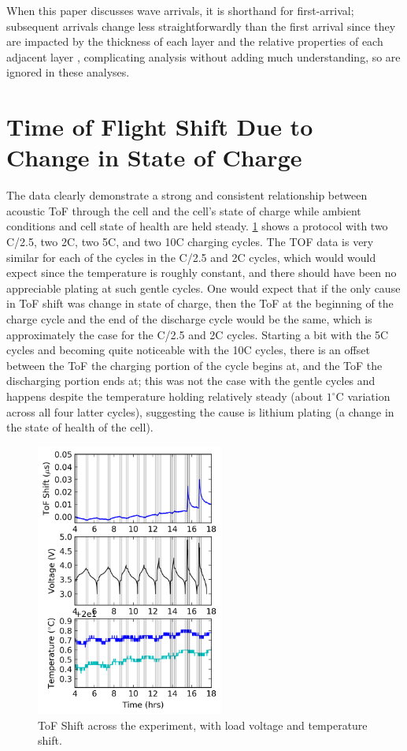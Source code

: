 When this paper discusses wave arrivals, it is shorthand for first-arrival; subsequent arrivals change less straightforwardly than the first arrival since they are impacted by the thickness of each layer and the relative properties of each adjacent layer \cite{SOC-SOH-EST}, complicating analysis without adding much understanding, so are ignored in these analyses.

\section{Time of Flight Shift Due to Change in State of Charge}
The data clearly demonstrate a strong and consistent relationship between acoustic ToF through the cell and the cell's state of charge while ambient conditions and cell state of health are held steady.  \hyperref[fig:0315]{\cref{fig:0315}} shows a protocol with two C/2.5, two 2C, two 5C, and two 10C charging cycles. The TOF data is very similar for each of the cycles in the C/2.5 and 2C cycles, which would would expect since the temperature is roughly constant, and there should have been no appreciable plating at such gentle cycles. One would expect that if the only cause in ToF shift was change in state of charge, then the ToF at the beginning of the charge cycle and the end of the discharge cycle would be the same, which is approximately the case for the C/2.5 and 2C cycles. Starting a bit with the 5C cycles and becoming quite noticeable with the 10C cycles, there is an offset between the ToF the charging portion of the cycle begins at, and the ToF the discharging portion ends at; this was not the case with the gentle cycles and happens despite the temperature holding relatively steady (about $1^{\circ}$C variation across all four latter cycles), suggesting the cause is lithium plating (a change in the state of health of the cell).

\begin{figure}[h!]\label{fig:0315}
    \includegraphics[width=0.55\textwidth]{Thesis/0315.png}
    \centering
    \caption{ToF Shift across the experiment, with load voltage and temperature shift.}
\end{figure}

